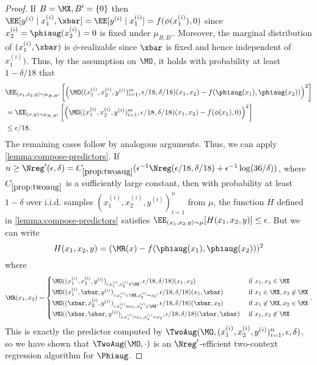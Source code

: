 \begin{proof}
If $B=\MX,B'=\{0\}$ then $\EE[y^{(i)}\mid{}x_1^{(i)},\xbar] = \EE[y^{(i)}\mid{}x_1^{(i)}] = f(\phi(x_1^{(i)}),0)$ since $x_2^{(i)}=\phiaug(x_2^{(i)})=0$ is fixed under $\mu_{B,B'}$. Moreover, the marginal distribution of $(x_1^{(i)},\xbar)$ is $\phi$-realizable since $\xbar$ is fixed and hence independent of $x_1^{(i)})$. Thus, by the assumption on $\MO$, it holds with probability at least $1-\delta/18$ that 
\begin{align*}
&\EE_{(x_1,x_2,y)\sim\mu_{B,B'}}\left[\left(\MO((x_1^{(i)},x_2^{(i)},y^{(i)})_{i=1}^m,\epsilon/18,\delta/18)(x_1,x_2) - f(\phiaug(x_1),\phiaug(x_2))\right)^2 \right] \\
&= \EE_{(x,y)\sim\mu_{B,B'}}\left[\left(\MO((x_1^{(i)},x_2^{(i)},y^{(i)})_{i=1}^m,\epsilon/18,\delta/18)(x_1,x_2) - f(\phi(x_1),0)\right)^2 \right] \\
&\leq \epsilon/18.
\end{align*}
The remaining cases follow by analogous arguments. Thus, we can apply \cref{lemma:compose-predictors}. If $n \geq \Nreg'(\epsilon,\delta) = C_{\ref{prop:twoaug}}(\epsilon^{-1}\Nreg(\epsilon/18,\delta/18)+\epsilon^{-1}\log(36/\delta))$, where $C_{\ref{prop:twoaug}}$ is a sufficiently large constant, then with probability at least $1-\delta$ over i.i.d. samples $(x_1^{(i)},x_2^{(i)},y^{(i)})_{i=1}^n$ from $\mu$, the function $H$ defined in \cref{lemma:compose-predictors} satisfies $\EE_{(x_1,x_2,y)\sim\mu}[H(x_1,x_2,y)] \leq \epsilon$. But we can write
\[H(x_1,x_2,y) = (\MR(x) - f(\phiaug(x_1),\phiaug(x_2)))^2\]
where
\[\MR(x_1,x_2) = \begin{cases} 
\MO((x_1^{(i)},x_2^{(i)},y^{(i)})_{i:x_1^{(i)},x_2^{(i)}\in\MX},\epsilon/18,\delta/18)(x_1,x_2) & \text{ if } x_1,x_2 \in \MX \\ 
\MO((x_1^{(i)},\xbar,y^{(i)})_{i:x_1^{(i)}\in\MX,x_2^{(i)}=x_2},\epsilon/18,\delta/18)(x_1,\xbar) & \text{ if } x_1 \in \MX, x_2\not \in\MX \\
\MO((\xbar,x_2^{(i)},y^{(i)})_{i:x_1^{(i)}=x_1,x_2^{(i)}\in\MX},\epsilon/18,\delta/18)(\xbar,x_2) & \text{ if } x_1 \not\in \MX, x_2 \in\MX \\
\MO((\xbar,\xbar,y^{(i)})_{i:x_1^{(i)}=x_1,x_2^{(i)}=x_2},\epsilon/18,\delta/18)(\xbar,\xbar) & \text{ if } x_1, x_2\not \in\MX
\end{cases}.\]
This is exactly the predictor computed by $\TwoAug(\MO,(x_1^{(i)},x_2^{(i)},y^{(i)})_{i=1}^n,\epsilon,\delta)$, so we have shown that $\TwoAug(\MO,\cdot)$ is an $\Nreg'$-efficient two-context regression algorithm for $\Phiaug$.
\end{proof}

